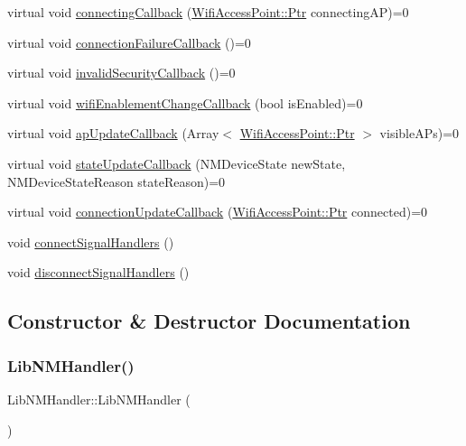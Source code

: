 \begin{DoxyCompactItemize}
\item 
virtual void \mbox{\hyperlink{classLibNMHandler_a0293706bcd78723eac0b4b03088d163c}{connecting\+Callback}} (\mbox{\hyperlink{classWifiAccessPoint_ad18977f884076774803027efbaa131a0}{Wifi\+Access\+Point\+::\+Ptr}} connecting\+AP)=0
\item 
virtual void \mbox{\hyperlink{classLibNMHandler_a66756166eb9bca40cd7659a55c2435c1}{connection\+Failure\+Callback}} ()=0
\item 
virtual void \mbox{\hyperlink{classLibNMHandler_ab6cd6eaa5bb09fd4991893176e40c00a}{invalid\+Security\+Callback}} ()=0
\item 
virtual void \mbox{\hyperlink{classLibNMHandler_ae607be1fd17c0b6fc20e824bf40cc23f}{wifi\+Enablement\+Change\+Callback}} (bool is\+Enabled)=0
\item 
virtual void \mbox{\hyperlink{classLibNMHandler_a6584162b6206786ca11dcdb1ab9a8822}{ap\+Update\+Callback}} (Array$<$ \mbox{\hyperlink{classWifiAccessPoint_ad18977f884076774803027efbaa131a0}{Wifi\+Access\+Point\+::\+Ptr}} $>$ visible\+A\+Ps)=0
\item 
virtual void \mbox{\hyperlink{classLibNMHandler_ac1354c45a99afddae6407e7a52a42556}{state\+Update\+Callback}} (N\+M\+Device\+State new\+State, N\+M\+Device\+State\+Reason state\+Reason)=0
\item 
virtual void \mbox{\hyperlink{classLibNMHandler_ac3edd122ddaea5d2322a719bed003dc5}{connection\+Update\+Callback}} (\mbox{\hyperlink{classWifiAccessPoint_ad18977f884076774803027efbaa131a0}{Wifi\+Access\+Point\+::\+Ptr}} connected)=0
\item 
void \mbox{\hyperlink{classLibNMHandler_a386a6857706ee714e22f2dc677af9b1a}{connect\+Signal\+Handlers}} ()
\item 
void \mbox{\hyperlink{classLibNMHandler_ac70dda104a5ef4824c87984e42196c44}{disconnect\+Signal\+Handlers}} ()
\end{DoxyCompactItemize}


\subsection{Constructor \& Destructor Documentation}
\mbox{\label{classLibNMHandler_a26c785ea6775c3a7294eb7d10a450864}} 
\subsubsection{\texorpdfstring{Lib\+N\+M\+Handler()}{LibNMHandler()}}
{\footnotesize\ttfamily Lib\+N\+M\+Handler\+::\+Lib\+N\+M\+Handler (\begin{DoxyParamCaption}{ }\end{DoxyParamCaption})}

